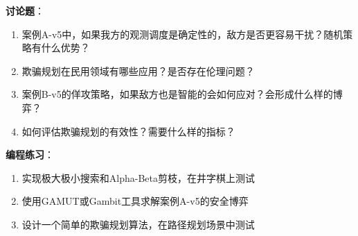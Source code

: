 \begin{discussbox}
\textbf{讨论题}：
\begin{enumerate}
  \item 案例A-v5中，如果我方的观测调度是确定性的，敌方是否更容易干扰？随机策略有什么优势？
  \item 欺骗规划在民用领域有哪些应用？是否存在伦理问题？
  \item 案例B-v5的佯攻策略，如果敌方也是智能的会如何应对？会形成什么样的博弈？
  \item 如何评估欺骗规划的有效性？需要什么样的指标？
\end{enumerate}

\textbf{编程练习}：
\begin{enumerate}
  \item 实现极大极小搜索和Alpha-Beta剪枝，在井字棋上测试
  \item 使用GAMUT或Gambit工具求解案例A-v5的安全博弈
  \item 设计一个简单的欺骗规划算法，在路径规划场景中测试
\end{enumerate}
\end{discussbox}
